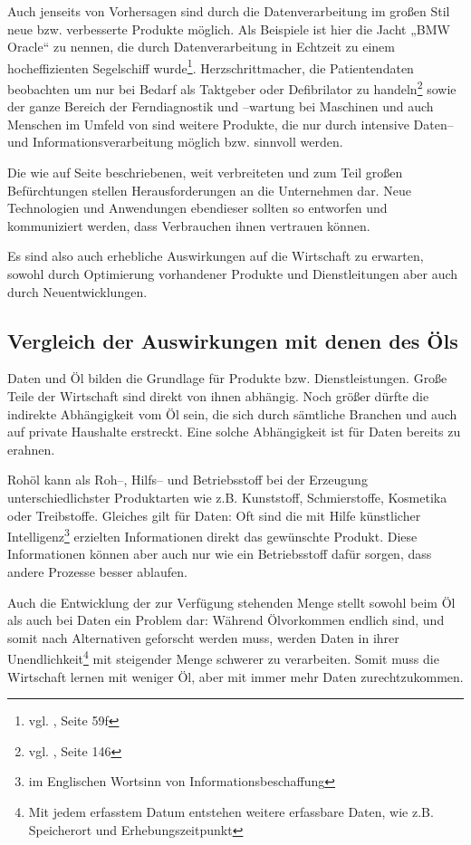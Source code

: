 Auch jenseits von Vorhersagen sind durch die Datenverarbeitung im großen Stil neue bzw. verbesserte Produkte möglich. Als Beispiele ist hier die Jacht „BMW Oracle“ zu nennen, die durch Datenverarbeitung in Echtzeit zu einem hocheffizienten Segelschiff wurde\footnote{vgl. \cite{laudon}, Seite 59f}. Herzschrittmacher, die Patientendaten beobachten um nur bei Bedarf als Taktgeber oder Defibrilator zu handeln\footnote{vgl. \cite{froeling}, Seite 146} sowie der ganze Bereich der Ferndiagnostik und --wartung bei Maschinen und auch Menschen im Umfeld von  sind weitere Produkte, die nur durch intensive Daten-- und Informationsverarbeitung möglich bzw. sinnvoll werden.

Die wie auf Seite \pageref{probleme} beschriebenen, weit verbreiteten und zum Teil großen Befürchtungen stellen Herausforderungen an die Unternehmen dar. Neue Technologien und Anwendungen ebendieser sollten so entworfen und kommuniziert werden, dass Verbrauchen ihnen vertrauen können.

Es sind also auch erhebliche Auswirkungen auf die Wirtschaft zu erwarten, sowohl durch Optimierung vorhandener Produkte und Dienstleitungen aber auch durch Neuentwicklungen.

\subsection{Vergleich der Auswirkungen mit denen des Öls}
\label{vergleich}

Daten und Öl bilden die Grundlage für Produkte bzw. Dienstleistungen. Große Teile der Wirtschaft sind direkt von ihnen abhängig. Noch größer dürfte die indirekte Abhängigkeit vom Öl sein, die sich durch sämtliche Branchen und auch auf private Haushalte erstreckt. Eine solche Abhängigkeit ist für Daten bereits zu erahnen.

Rohöl kann als Roh--, Hilfs-- und Betriebsstoff bei der Erzeugung unterschiedlichster Produktarten wie z.B. Kunststoff, Schmierstoffe, Kosmetika oder Treibstoffe. Gleiches gilt für Daten: Oft sind die mit Hilfe künstlicher Intelligenz\footnote{im Englischen Wortsinn von Informationsbeschaffung} erzielten Informationen direkt das gewünschte Produkt. Diese Informationen können aber auch nur wie ein Betriebsstoff dafür sorgen, dass andere Prozesse besser ablaufen.

Auch die Entwicklung der zur Verfügung stehenden Menge stellt sowohl beim Öl als auch bei Daten ein Problem dar: Während Ölvorkommen endlich sind, und somit nach Alternativen geforscht werden muss, werden Daten in ihrer Unendlichkeit\footnote{Mit jedem erfasstem Datum entstehen weitere erfassbare Daten, wie z.B. Speicherort und Erhebungszeitpunkt} mit steigender Menge schwerer zu verarbeiten. Somit muss die Wirtschaft lernen mit weniger Öl, aber mit immer mehr Daten zurechtzukommen.

